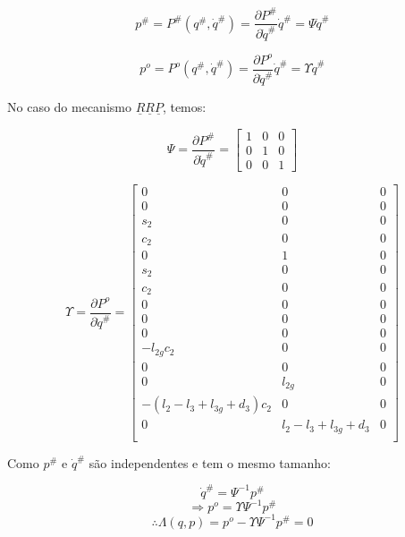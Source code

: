\documentclass[12pt,a4paper]{article}
\begin{document}
\begin{itemize}
\begin{itemize}
\begin{itemize}
$$ p^{\#} = P^{\#} (q^{\#}, \dot{q}^{\#} ) = \frac{\partial P^{\#}}{\partial \dot{q}^{\#}} \dot{q}^{\#} = \Psi \dot{q}^{\#}  $$

$$ p^o = P^o (q^{\#}, \dot{q}^{\#} ) = \frac{\partial P^o}{\partial \dot{q}^{\#}} \dot{q}^{\#} = \Upsilon \dot{q}^{\#}  $$

No caso do mecanismo $\underline{R}\underline{R}\underline{P}$, temos:

$$
\Psi = \frac{\partial P^{\#}}{\partial \dot{q}^{\#}} =
\begin{bmatrix}
1 & 0 & 0 \\
0 & 1 & 0 \\
0 & 0 & 1
\end{bmatrix}
$$

$$
\Upsilon = \frac{\partial P^o}{\partial \dot{q}^{\#}} =
\begin{bmatrix}
0 & 0 & 0 \\
0 & 0 & 0 \\
s_2 & 0 & 0 \\
c_2 & 0 & 0 \\
0 & 1 & 0 \\
s_2 & 0 & 0 \\
c_2 & 0 & 0 \\
0 & 0 & 0 \\
0 & 0 & 0 \\
0 & 0 & 0 \\
-l_{2g} c_2 & 0 & 0 \\
0 & 0 & 0 \\
0 & l_{2g} & 0 \\
-(l_2 - l_3 + l_{3g} + d_3) c_2 & 0 & 0 \\
0 & l_2 - l_3 + l_{3g} + d_3 & 0 \\

\end{bmatrix}
$$

Como $p^{\#}$ e $\dot{q}^{\#}$ são independentes e tem o mesmo tamanho:

$$ \dot{q}^{\#} = \Psi^{-1} p^{\#} $$
$$ \Rightarrow  p^o = \Upsilon \Psi^{-1} p^{\#} $$
$$ \therefore \Lambda(q,p) =  p^o - \Upsilon \Psi^{-1} p^{\#} = 0 $$


\end{itemize}
\end{itemize}
\end{itemize}
\end{document}
